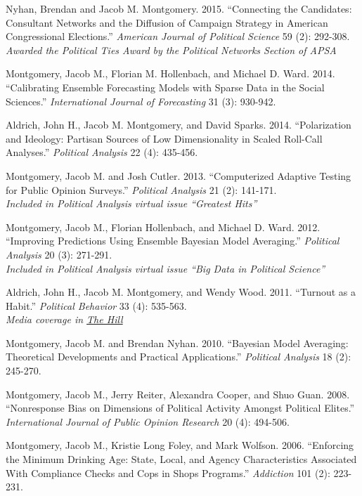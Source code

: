 \documentclass[10pt]{article}
\renewenvironment{CV}
  {\begin{list}{}
    {\renewcommand{\makelabel}{\entrylabel}
    \setlength{\labelwidth}{55pt}
    \setlength{\leftmargin}{62pt}
  }}
  {\end{list}}
\newcommand{\cvnote}[1]{\\[0.1em]{\hspace*{0.5em}\small\itshape #1}}
\begin{document}
\begin{CV}
\item[] Nyhan, Brendan and Jacob M. Montgomery. 2015. ``Connecting
  the Candidates: Consultant Networks and the Diffusion of Campaign
  Strategy in American Congressional Elections.'' \textit{American Journal of Political Science} 59 (2): 292-308.\cvnote{Awarded the Political Ties Award by the Political Networks Section of APSA}

\item[] Montgomery, Jacob M., Florian M. Hollenbach, and Michael D. Ward. 2014.  ``Calibrating Ensemble Forecasting Models with Sparse Data in the Social Sciences.''    \textit{International Journal of Forecasting} 31 (3): 930-942.

  
\item[] Aldrich, John H., Jacob M. Montgomery, and David Sparks. 2014. ``Polarization and Ideology: Partisan Sources of Low Dimensionality in Scaled Roll-Call Analyses.'' \textit{Political Analysis} 22 (4): 435-456.




\item[] Montgomery, Jacob M. and Josh Cutler. 2013. ``Computerized Adaptive Testing for Public Opinion Surveys.'' \textit{Political Analysis} 21 (2): 141-171.\cvnote{Included in \textit{Political Analysis} virtual issue ``Greatest Hits''}




\item[] Montgomery, Jacob M., Florian Hollenbach, and Michael D. Ward. 2012. ``Improving Predictions Using Ensemble Bayesian Model
  Averaging.'' \textit{Political Analysis} 20 (3): 271-291.\cvnote{Included in \textit{Political Analysis} virtual issue ``Big Data in Political Science''}

\item[] Aldrich, John H., Jacob M. Montgomery, and Wendy Wood. 2011.
  ``Turnout as a Habit.'' \emph{Political Behavior} 33 (4): 535-563.
\cvnote{Media coverage in \href{https://thehill.com/opinion/campaign/456934-how-voting-becomes-a-habit}{The Hill}}

\item[] Montgomery, Jacob M. and Brendan Nyhan. 2010. ``Bayesian Model Averaging: Theoretical Developments and Practical Applications.'' \textit{Political Analysis} 18 (2): 245-270.

\item[] Montgomery, Jacob M., Jerry Reiter, Alexandra Cooper, and Shuo Guan. 2008. ``Nonresponse Bias on Dimensions of Political Activity
Amongst Political Elites.'' \emph{International Journal of Public Opinion Research} 20 (4): 494-506.


\item[] Montgomery, Jacob M., Kristie Long Foley, and Mark Wolfson.  2006.  ``Enforcing the Minimum Drinking Age: State, Local, and
Agency Characteristics Associated With Compliance Checks and Cops in
Shops Programs.'' \emph{Addiction} 101 (2): 223-231.




\end{CV}
\end{document}
